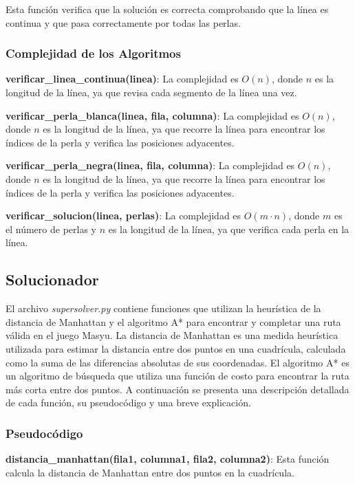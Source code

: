 \documentclass{article}
\begin{document}
Esta función verifica que la solución es correcta comprobando que la línea es continua y que pasa correctamente por todas las perlas.

\subsubsection{Complejidad de los Algoritmos}

\textbf{verificar\_linea\_continua(linea)}: La complejidad es \(O(n)\), donde \(n\) es la longitud de la línea, ya que revisa cada segmento de la línea una vez.

\textbf{verificar\_perla\_blanca(linea, fila, columna)}: La complejidad es \(O(n)\), donde \(n\) es la longitud de la línea, ya que recorre la línea para encontrar los índices de la perla y verifica las posiciones adyacentes.

\textbf{verificar\_perla\_negra(linea, fila, columna)}: La complejidad es \(O(n)\), donde \(n\) es la longitud de la línea, ya que recorre la línea para encontrar los índices de la perla y verifica las posiciones adyacentes.

\textbf{verificar\_solucion(linea, perlas)}: La complejidad es \(O(m \cdot n)\), donde \(m\) es el número de perlas y \(n\) es la longitud de la línea, ya que verifica cada perla en la línea.

\subsection{Solucionador}

El archivo \textit{supersolver.py} contiene funciones que utilizan la heurística de la distancia de Manhattan y el algoritmo A* para encontrar y completar una ruta válida en el juego Masyu. La distancia de Manhattan es una medida heurística utilizada para estimar la distancia entre dos puntos en una cuadrícula, calculada como la suma de las diferencias absolutas de sus coordenadas. El algoritmo A* es un algoritmo de búsqueda que utiliza una función de costo para encontrar la ruta más corta entre dos puntos. A continuación se presenta una descripción detallada de cada función, su pseudocódigo y una breve explicación.

\subsubsection{Pseudocódigo}

\textbf{distancia\_manhattan(fila1, columna1, fila2, columna2)}: Esta función calcula la distancia de Manhattan entre dos puntos en la cuadrícula.
\end{document}

